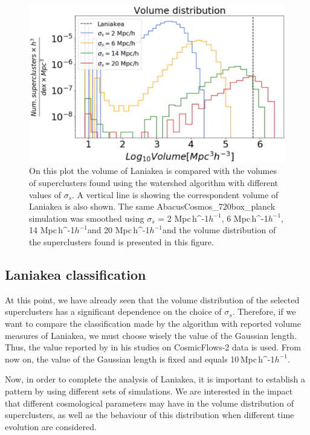 \documentclass[usenatbib]{mnras}
\newcommand{\Mpch}{\,{\rm Mpc}\,\ifmmode h^{-1}\else $h^{-1}$\fi}
\begin{document}
\begin{figure}
    \centering
    \includegraphics[width=345pt]{vol_different_sigmas.pdf}
    \caption{On this plot the volume of Laniakea is compared with the volumes of superclusters found using the watershed algorithm with different values of $\sigma_s$. A vertical line is showing the correspondent volume of Laniakea is also shown. The same AbacusCosmos\_720box\_planck simulation was smoothed using $\sigma_s$ = 2\,\Mpch, 6\,\Mpch, 14\,\Mpch and 20\,\Mpch and the volume distribution of the superclusters found is presented in this figure.} 
    \label{fig:HISTVMD2}
\end{figure}




\subsection{Laniakea classification}

At this point, we have already seen that the volume distribution of the selected superclusters has a significant dependence on the choice of $\sigma_s$. Therefore, if we want to compare the classification made by the algorithm with reported volume measures of Laniakea, we must choose wisely the value of the Gaussian length. Thus, the value reported by \cite{2014Natur.513...71T} in his studies on CosmicFlows-2 data is used. From now on, the value of the Gaussian length is fixed and equals 10\Mpch. 

Now, in order to complete the analysis of Laniakea, it is important to establish a pattern by using different sets of simulations. We are interested in the impact that different cosmological parameters may have in the volume distribution of superclusters, as well as the behaviour of this distribution when different time evolution are considered.
\end{document}
